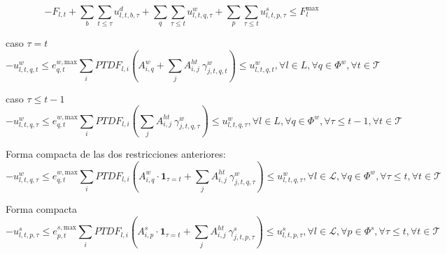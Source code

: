 \begin{dmath}
- F_{l, t} + \sum_{b}\sum_{t \leq \tau} u^{d}_{l,t,b,\tau} + \sum_{q} \sum_{\tau \leq t}u^{w}_{l,t,q,\tau}+ \sum_{p} \sum_{\tau \leq t} u^{s}_{l,t,p,\tau} \leq F_{l}^{\text{max}}
\end{dmath}



caso $\tau = t$
\begin{equation}
-u_{l,t,q,t}^{w} \le e_{q,t}^{w,\text{max}} \sum_{i}PTDF_{l,i} \left( A_{i,q}^w + \sum_{j}A_{i,j}^{ht} \: \gamma_{j,t,q,t}^{w} \right) \le u_{l,t,q,t}^{w} , \forall l \in L, \forall q \in \Phi^{w}, \forall t \in \mathcal{T}
\end{equation}

caso $\tau \leq t-1$
\begin{equation}
-u_{l,t,q,\tau}^{w} \le e_{q,t}^{w, \text{max}} \sum_{i}PTDF_{l,i} \left( \sum_{j}A_{i,j}^{ht} \: \gamma_{j,t,q,\tau}^{w} \right) \le u_{l,t,q,\tau}^{w} , \forall l \in L, \forall q \in \Phi^{w}, \forall \tau \leq t - 1, \forall t \in \mathcal{T}
\end{equation}

Forma compacta de las dos restricciones anteriores:
\begin{equation}
-u_{l,t,q,\tau}^{w} \le e_{q,t}^{w, \text{max}} \sum_{i}PTDF_{l,i} \left( A_{i,q}^w \cdot \mathbf{1}_{\tau = t} + \sum_{j}A_{i,j}^{ht} \: \gamma_{j,t,q,\tau}^{w} \right) \le u_{l,t,q,\tau}^{w} , \forall l \in \mathcal{L}, \forall q \in \Phi^{w}, \forall \tau \leq t, \forall t \in \mathcal{T}
\end{equation}

Forma compacta
\begin{equation}
-u_{l,t,p,\tau}^{s} \le e_{p,t}^{s, \text{max}} \sum_{i}PTDF_{l,i} \left( A_{i,p}^s \cdot \mathbf{1}_{\tau = t} + \sum_{j}A_{i,j}^{ht} \: \gamma_{j,t,p,\tau}^{s} \right) \le u_{l,t,p,\tau}^{s} , \forall l \in \mathcal{L}, \forall p \in \Phi^{s}, \forall \tau \leq t, \forall t \in \mathcal{T}
\end{equation}

